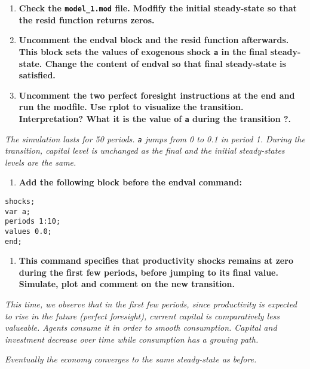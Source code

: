 \documentclass[
  letterpaper,
  DIV=11,
  numbers=noendperiod]{scrartcl}
\providecommand{\tightlist}{%
  \setlength{\itemsep}{0pt}\setlength{\parskip}{0pt}}\usepackage{longtable,booktabs,array}
\begin{document}
\begin{enumerate}
\def\labelenumi{\arabic{enumi}.}
\item
  \textbf{Check the \texttt{model\_1.mod} file. Modfify the initial
  steady-state so that the resid function returns zeros.}
\item
  \textbf{Uncomment the endval block and the resid function afterwards.
  This block sets the values of exogenous shock \texttt{a} in the final
  steady-state. Change the content of endval so that final steady-state
  is satisfied.}
\item
  \textbf{Uncomment the two perfect foresight instructions at the end
  and run the modfile. Use rplot to visualize the transition.
  Interpretation? What it is the value of \texttt{a} during the
  transition ?.}
\end{enumerate}

\emph{The simulation lasts for 50 periods. \texttt{a} jumps from 0 to
0.1 in period 1. During the transition, capital level is unchanged as
the final and the initial steady-states levels are the same.}

\begin{enumerate}
\def\labelenumi{\arabic{enumi}.}
\setcounter{enumi}{3}
\tightlist
\item
  \textbf{Add the following block before the endval command:}
\end{enumerate}

\begin{verbatim}
shocks;
var a;
periods 1:10;
values 0.0;
end;
\end{verbatim}

\begin{enumerate}
\def\labelenumi{\arabic{enumi}.}
\setcounter{enumi}{4}
\tightlist
\item
  \textbf{This command specifies that productivity shocks remains at
  zero during the first few periods, before jumping to its final value.
  Simulate, plot and comment on the new transition.}
\end{enumerate}

\emph{This time, we observe that in the first few periods, since
productivity is expected to rise in the future (perfect foresight),
current capital is comparatively less valueable. Agents consume it in
order to smooth consumption. Capital and investment decrease over time
while consumption has a growing path.}

\emph{Eventually the economy converges to the same steady-state as
before.}
\end{document}

